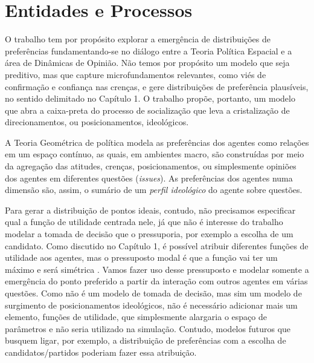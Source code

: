 \section{Entidades e Processos}

O trabalho tem por propósito explorar a emergência de distribuições de
preferências fundamentando-se no diálogo entre a Teoria Política Espacial e a
área de Dinâmicas de Opinião. Não temos por propósito um modelo que seja
preditivo, mas que capture microfundamentos relevantes, como viés de confirmação
e confiança nas crenças, e gere distribuições de preferência plausíveis, no
sentido delimitado no Capítulo 1. O trabalho propõe, portanto, um modelo que
abra a caixa-preta do processo de socialização que leva a cristalização de
direcionamentos, ou posicionamentos, ideológicos.

A Teoria Geométrica de política modela as preferências dos agentes como relações
em um espaço contínuo, as quais, em ambientes macro, são construídas por meio da
agregação das atitudes, crenças, posicionamentos, ou simplesmente opiniões dos
agentes em diferentes questões (\textit{issues}). As preferências dos agentes
numa dimensão são, assim, o sumário de um \textit{perfil ideológico} do agente
sobre questões.

Para gerar a distribuição de pontos ideais, contudo, não precisamos especificar
qual a função de utilidade centrada nele, já que não é interesse do trabalho
modelar a tomada de decisão que o pressuporia, por exemplo a escolha de um
candidato. Como discutido no Capítulo 1, é possível atribuir diferentes funções
de utilidade aos agentes, mas o pressuposto modal é que a função vai ter um
máximo e será simétrica \cite{eguia2013spatial, carroll2013structure}. Vamos
fazer uso desse pressuposto e modelar somente a emergência do ponto preferido a
partir da interação com outros agentes em várias questões. Como não é um modelo
de tomada de decisão, mas sim um modelo de surgimento de posicionamentos
ideológicos, não é necessário adicionar mais um elemento, funções de utilidade,
que simplesmente alargaria o espaço de parâmetros e não seria utilizado na
simulação. Contudo, modelos futuros que busquem ligar, por exemplo, a
distribuição de preferências com a escolha de candidatos/partidos poderiam fazer
essa atribuição.


